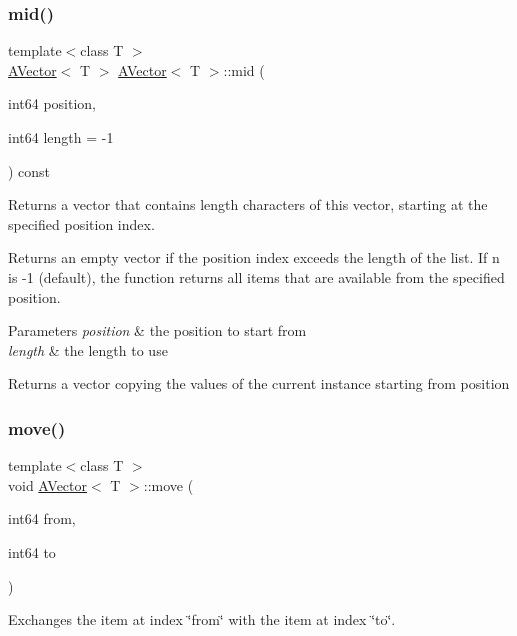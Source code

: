 \subsubsection{\texorpdfstring{mid()}{mid()}}
{\footnotesize\ttfamily template$<$class T $>$ \\
\mbox{\hyperlink{class_a_vector}{A\+Vector}}$<$ T $>$ \mbox{\hyperlink{class_a_vector}{A\+Vector}}$<$ T $>$\+::mid (\begin{DoxyParamCaption}\item[{int64}]{position,  }\item[{int64}]{length = {\ttfamily -\/1} }\end{DoxyParamCaption}) const}



Returns a vector that contains length characters of this vector, starting at the specified position index. 

Returns an empty vector if the position index exceeds the length of the list. If n is -\/1 (default), the function returns all items that are available from the specified position.


\begin{DoxyParams}{Parameters}
{\em position} & the position to start from \\
\hline
{\em length} & the length to use \\
\hline
\end{DoxyParams}
\begin{DoxyReturn}{Returns}
a vector copying the values of the current instance starting from position 
\end{DoxyReturn}
\mbox{\label{class_a_vector_a4a3c6ccac7533cee9e2e2a0fddde0d77}} 
\subsubsection{\texorpdfstring{move()}{move()}}
{\footnotesize\ttfamily template$<$class T $>$ \\
void \mbox{\hyperlink{class_a_vector}{A\+Vector}}$<$ T $>$\+::move (\begin{DoxyParamCaption}\item[{int64}]{from,  }\item[{int64}]{to }\end{DoxyParamCaption})}



Exchanges the item at index \char`\"{}from\char`\"{} with the item at index \char`\"{}to\char`\"{}. 


